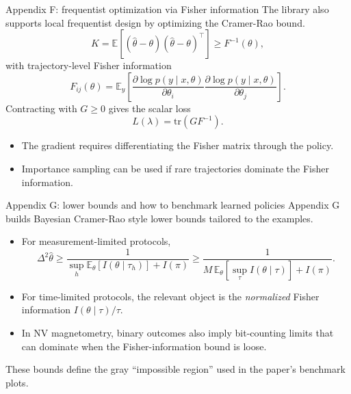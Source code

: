 \documentclass[aspectratio=169]{beamer}
\begin{document}
\begin{frame}{Appendix F: frequentist optimization via Fisher information}
The library also supports local frequentist design by optimizing the Cramer-Rao bound.
\vspace{0.4em}
\[
  K=\mathbb E\!\left[(\hat\theta-\theta)(\hat\theta-\theta)^\top\right]\ge F^{-1}(\theta),
\]
with trajectory-level Fisher information
\[
  F_{ij}(\theta)=\mathbb E_y\!\left[\frac{\partial\log p(y\mid x,\theta)}{\partial\theta_i}
  \frac{\partial\log p(y\mid x,\theta)}{\partial\theta_j}\right].
\]
Contracting with $G\ge 0$ gives the scalar loss
\[
  L(\lambda)=\mathrm{tr}\!\left(GF^{-1}\right).
\]
\begin{itemize}
  \item The gradient requires differentiating the Fisher matrix through the policy.
  \item Importance sampling can be used if rare trajectories dominate the Fisher information.
\end{itemize}
\end{frame}

\begin{frame}{Appendix G: lower bounds and how to benchmark learned policies}
Appendix G builds Bayesian Cramer-Rao style lower bounds tailored to the examples.
\vspace{0.4em}
\begin{itemize}
  \item For measurement-limited protocols,
  \[
    \Delta^2\hat\theta\ge \frac{1}{\sup_h \mathbb E_\theta[I(\theta\mid \tau_h)] + I(\pi)}
    \ge \frac{1}{M\,\mathbb E_\theta[\sup_\tau I(\theta\mid\tau)] + I(\pi)}.
  \]
  \item For time-limited protocols, the relevant object is the \emph{normalized} Fisher information $I(\theta\mid\tau)/\tau$.
  \item In NV magnetometry, binary outcomes also imply bit-counting limits that can dominate when the Fisher-information bound is loose.
\end{itemize}
\vspace{0.4em}
These bounds define the gray ``impossible region'' used in the paper's benchmark plots.
\end{frame}
\end{document}
